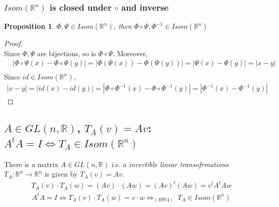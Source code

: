 \documentclass[11pt,a4paper]{article}
\newtheorem{proposition}{Proposition}
\begin{document}
\subsubsection{$Isom(\mathbb{R}^n)$ is closed under $\circ$ and inverse}
\begin{proposition}
$\varPhi, \varPsi \in Isom(\mathbb{R}^n)$, then $\varPhi\circ\varPsi, \varPhi^{-1}\in Isom(\mathbb{R}^n)$
\end{proposition}
\begin{proof}
\quad\\
Since $\varPhi,\varPsi$ are bijections, so is $\varPhi\circ\varPsi$. Moreover,\\
\begin{equation}
    \begin{aligned}
        &|\varPhi\circ\varPsi(x)-\varPhi\circ\varPsi(y)|=|\varPhi(\varPsi(x))-\varPhi(\varPsi(y))|=|\varPsi(x)-\varPsi(y)|=|x-y|\\
    \end{aligned}
    \nonumber
\end{equation}
Since $id\in Isom (\mathbb{R}^n)$,
\begin{equation}
    \begin{aligned}
        |x-y|=|id(x)-id(y)|=|\varPhi\circ\varPhi^{-1}(x)-\varPhi\circ\varPhi^{-1}(y)|=|\varPhi^{-1}(x)-\varPhi^{-1}(y)|
    \end{aligned}
    \nonumber
\end{equation}
\end{proof}

\subsection{$A\in GL(n,\mathbb{R})$, $T_A(v)=Av$: $A^tA=I \Leftrightarrow T_A\in Isom(\mathbb{R}^n)$}
There is a matrix $A\in GL(n,\mathbb{R})$ i.e. a \textit{invertible linear transofrmations} $T_A: \mathbb{R}^n \rightarrow \mathbb{R}^n$ is given by $T_A(v)=Av$.
\begin{equation}
    \begin{aligned}
        T_A(v)\cdot T_A(w)=(Av)\cdot(Aw)=(Av)^t(Aw)=v^tA^tAw
    \end{aligned}
    \nonumber
\end{equation}
\begin{equation}
    \begin{aligned}
        A^tA=I\Leftrightarrow T_A(v)\cdot T_A(w)=v\cdot w\Leftrightarrow_{(HW4)}\ T_A\in Isom(\mathbb{R}^n)
    \end{aligned}
    \nonumber
\end{equation}
\end{document}
